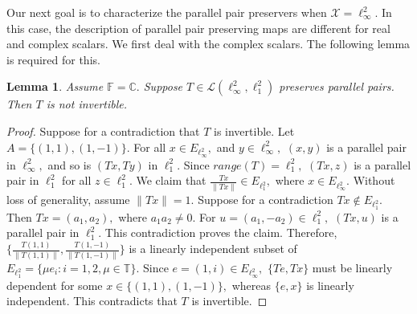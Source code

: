 \documentclass{amsart}
\newtheorem{lemma}[theorem]{Lemma}
\theoremstyle{definition}
\theoremstyle{remark}
\numberwithin{equation}{section}
\begin{document}
Our next goal is to characterize  the parallel  pair preservers when $\mathcal{X}= \ell_\infty^2.$ In this case, the description of parallel pair preserving maps are different for real and complex scalars. We first deal with the complex scalars.
The following lemma is required for this.

\begin{lemma}\label{lem-ninv}
	Assume $\mathbb{F}=\mathbb{C}.$ 
	Suppose $T\in \mathcal{L}(\ell_\infty^2, \ell_1^2)$ preserves parallel pairs.  Then $T$ is not invertible.	
\end{lemma}
\begin{proof}
	Suppose for a contradiction that $T$ is invertible. Let $A=\{(1,1),(1,-1)\}.$   %
	For all $x\in E_{\ell_\infty^2},$ and $y\in \ell_\infty^2,$ $(x,y)$ is a parallel pair in $\ell_\infty^2,$ and so is $(Tx,Ty)$ in $\ell_1^2.$ Since $range(T)=\ell_1^2,$ $(Tx,z)$ is a parallel pair in $\ell_1^2$ for all $z\in \ell_1^2.$ We claim that $\frac{Tx}{\|Tx\|}\in E_{\ell_1^2},$ where $x\in E_{\ell_\infty^2}.$ Without loss of generality, assume $\|Tx\|=1.$ Suppose for a contradiction $Tx\notin E_{\ell_1^2}.$ Then $Tx=(a_1,a_2),$ where  $a_1a_2\neq 0.$ For $u=(a_1,-a_2)\in \ell_1^2,$ $(Tx,u)$ is a parallel pair in $\ell_1^2.$  This contradiction proves the claim. Therefore, $\{\frac{T(1,1)}{\|T(1,1)\|},\frac{T(1,-1)}{\|T(1,-1)\|}\}$ is a linearly independent subset of $E_{\ell_1^2}=\{\mu e_i:i=1,2,\mu\in \mathbb{T}\}.$ 
	Since $e=(1,i)\in E_{\ell_\infty^2},$  $\{Te,Tx\}$ must be linearly dependent for some $x\in\{(1,1),(1,-1)\},$ whereas $\{e,x\}$ is linearly independent. This contradicts that $T$ is invertible.
\end{proof}
\end{document}
